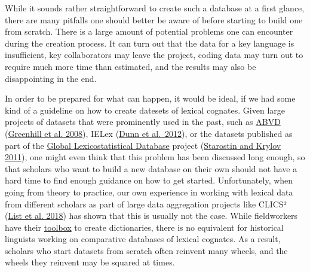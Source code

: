 \documentclass[
  a4paper,
  14pt,
  oneside,
  tablecaptionabove
]{scrbook}
\begin{document}
While it sounds rather straightforward to create such a database at a
first glance, there are many pitfalls one should better be aware of
before starting to build one from scratch. There is a large amount of
potential problems one can encounter during the creation process. It can
turn out that the data for a key language is insufficient, key
collaborators may leave the project, coding data may turn out to require
much more time than estimated, and the results may also be disappointing
in the end.

In order to be prepared for what can happen, it would be ideal, if we
had some kind of a guideline on how to create datesets of lexical
cognates. Given large projects of datasets that were prominently used in
the past, such as \href{https://abvd.shh.mpg.de}{ABVD} (\href{http://bibliography.lingpy.org?key=Greenhill2008}{Greenhill et al.
2008}), IELex (\href{http://bibliography.lingpy.org?key=Dunn2012}{Dunn
et al.~2012}), or the datasets published as part of the
\href{http://starling.rinet.ru/new100/}{Global Lexicostatistical
Database} project (\href{http://bibliography.lingpy.org?key=Starostin2011}{Starostin and
Krylov 2011}), one might even think that this problem has been
discussed long enough, so that scholars who want to build a new database
on their own should not have a hard time to find enough guidance on how
to get started. Unfortunately, when going from theory to practice, our
own experience in working with lexical data from different scholars as
part of large data aggregation projects like CLICS² (\href{http://bibliography.lingpy.org?key=List2018f}{List et al. 2018})
has shown that this is usually not the case. While fieldworkers have
their \href{https://software.sil.org/toolbox/}{toolbox} to create
dictionaries, there is no equivalent for historical linguists working on
comparative databases of lexical cognates. As a result, scholars who
start datasets from scratch often reinvent many wheels, and the wheels
they reinvent may be squared at times.
\end{document}
